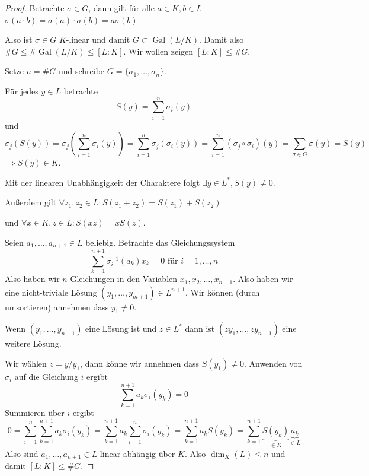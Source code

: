 \documentclass[12pt,parskip=full]{scrartcl}
\DeclareMathOperator{\Gal}{Gal}
\theoremstyle{definition}
\theoremstyle{remark}
\begin{document}
	\begin{proof}
		Betrachte $\sigma \in G$, dann gilt für alle $a \in K, b \in L$ $\sigma(a \cdot b) = \sigma(a) \cdot \sigma(b) = a \sigma(b)$.
		
		Also ist $\sigma \in G$ $K$-linear und damit $G \subset \Gal(L/K)$. Damit also $\#G \leq \#\Gal(L/K) \leq [L:K]$. Wir wollen zeigen $[L:K] \leq \#G$.
		
		Setze $n = \#G$ und schreibe $G = \{ \sigma_1, \dots, \sigma_n \}$.
		
		Für jedes $y \in L$ betrachte
		\begin{equation*}
			S(y) = \sum_{i = 1}^n \sigma_i(y)
		\end{equation*}
		und
		\begin{equation*}
			\sigma_j(S(y)) = \sigma_j \left( \sum_{i = 1}^n \sigma_i(y) \right) = \sum_{i = 1}^n \sigma_j(\sigma_i(y)) = \sum_{i = 1}^n (\sigma_j \circ \sigma_i)(y) = \sum_{\sigma \in G} \sigma(y) = S(y)
		\end{equation*}
		$\Rightarrow S(y) \in K$.
		
		Mit der linearen Unabhängigkeit der Charaktere folgt $\exists y \in L^*, S(y) \neq 0$.
		
		Außerdem gilt $\forall z_1, z_2 \in L: S(z_1 + z_2) = S(z_1) + S(z_2)$
		
		und $\forall x \in K, z \in L: S(xz) = x S(z)$.
		
		Seien $a_1, \dots, a_{n+1} \in L$ beliebig. Betrachte das Gleichungssystem
		\begin{equation*}
			\sum_{k = 1}^{n+1} \sigma_i^{-1}(a_k) x_k = 0 \text{ für $i = 1, \dots, n$}
		\end{equation*}
		Also haben wir $n$ Gleichungen in den Variablen $x_1, x_2, \dots, x_{n+1}$. Also haben wir eine nicht-triviale Lösung $(y_1, \dots, y_{m+1}) \in L^{n+1}$. Wir können (durch umsortieren) annehmen dass $y_1 \neq 0$.
		
		Wenn $(y_1, \dots, y_{n-1})$ eine Lösung ist und $z \in L^*$ dann ist $(zy_1, \dots, zy_{n+1})$ eine weitere Lösung.
		
		Wir wählen $z = y/y_1$, dann könne wir annehmen dass $S(y_1) \neq 0$. Anwenden von $\sigma_i$ auf die Gleichung $i$ ergibt
		\begin{equation*}
			\sum_{k = 1}^{n+1} a_k \sigma_i(y_k) = 0
		\end{equation*}
		Summieren über $i$ ergibt
		\begin{equation*}
			0 = \sum_{i = 1}^n \sum_{k = 1}^{n+1} a_k \sigma_i(y_k) = \sum_{k = 1}^{n+1} a_k \sum_{i = 1}^n \sigma_i(y_k) = \sum_{k = 1}^{n+1} a_k S(y_k) = \sum_{k = 1}^{n+1} \underbrace{S(y_k)}_{\in K} \underbrace{a_k}_{\in L}
		\end{equation*}
		Also sind $a_1, \dots, a_{n+1} \in L$ linear abhängig über $K$. Also $\dim_K(L) \leq n$ und damit $[L:K] \leq \#G$.
	\end{proof}
\end{document}
